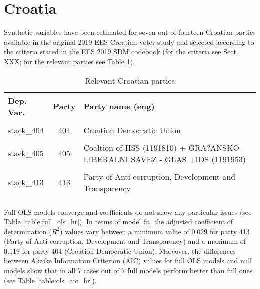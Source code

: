 \documentclass[
]{article}
\begin{document}
\hypertarget{croatia}{%
\section{Croatia}\label{croatia}}

Synthetic variables have been estimated for seven out of fourteen Croatian parties available in the original
2019 EES Croatian voter study and selected according to the criteria stated in the EES 2019 SDM codebook (for the criteria see Sect. XXX; for the relevant parties see Table \ref{table:relprty_tab_hr}).

\begin{table}[!h]

\caption{\label{tab:unnamed-chunk-31}Relevant Croatian parties \label{table:relprty_tab_hr}}
\centering
\begin{tabular}[t]{lcl}
\toprule
Dep. Var. & Party & Party name (eng)\\
\midrule
\cellcolor{gray!6}{stack\_412} & \cellcolor{gray!6}{412} & \cellcolor{gray!6}{Social Democratic Party of Croatia}\\
stack\_404 & 404 & Croation Democratic Union\\
\cellcolor{gray!6}{stack\_414} & \cellcolor{gray!6}{414} & \cellcolor{gray!6}{Human Shield}\\
stack\_405 & 405 & Coaltion of  HSS (1191810) + GRA?ANSKO-LIBERALNI SAVEZ - GLAS +IDS (1191953)\\
\cellcolor{gray!6}{stack\_406} & \cellcolor{gray!6}{406} & \cellcolor{gray!6}{Bridge of Independent Lists}\\
\addlinespace
stack\_413 & 413 & Party of Anti-corruption, Development and Transparency\\
\cellcolor{gray!6}{stack\_401} & \cellcolor{gray!6}{401} & \cellcolor{gray!6}{Milan Bandic 365 -- The Party of Labour and Solidarity}\\
\bottomrule
\end{tabular}
\end{table}

Full OLS models converge and coefficients do not show any particular issues (see Table
\ref{table:full_ols_hr}).
In terms of model fit, the adjusted coefficient of determination (\(R^2\)) values vary between
a minimum value of 0.029
for party 413
(Party of Anti-corruption, Development and Transparency)
and a maximum of 0.119
for party 404
(Croation Democratic Union).
Moreover, the differences between Akaike Information Criterion (AIC) values for full OLS models and null
models show that in all 7 cases out of 7 full models perform better than full ones (see Table
\ref{table:ols_aic_hr}).
\end{document}
